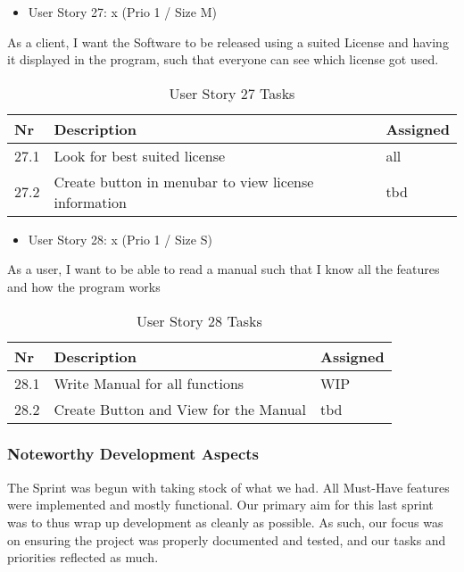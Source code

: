 \begin{itemize}
	\item User Story 27: x (Prio 1 / Size M)
	\end{itemize}
As a client,
I want the Software to be released using a suited License and having it displayed in the program,
such that everyone can see which license got used.	
\begin{table}[h]
  \caption{User Story 27 Tasks}
  \label{Story 23 Tasks}
  \centering
  \begin{tabular}{p{1cm}|p{5cm}|p{3cm}|}
  	Nr & Description & Assigned \\ 
  	\hline
  	27.1 & Look for best suited license & all \\ 
  	\hline
  	27.2 & Create button in menubar to view license information & tbd \\ 
  	\hline
  \end{tabular}
\end{table}

\newpage
\begin{itemize}
	\item User Story 28: x (Prio 1 / Size S)
	\end{itemize}
As a user,
I want to be able to read a manual
such that I know all the features and how the program works
\begin{table}[h!]
  \caption{User Story 28 Tasks}
  \label{Story 28 Tasks}
  \centering
  \begin{tabular}{p{1cm}|p{5cm}|p{3cm}|}
  	Nr & Description & Assigned \\ 
  	\hline
  	28.1 & Write Manual for all functions & WIP \\ 
  	\hline
  	28.2 & Create Button and View for the Manual & tbd \\ 
  	\hline
  \end{tabular}
\end{table}

\subsubsection*{Noteworthy Development Aspects}

The Sprint was begun with taking stock of what we had. All Must-Have features were implemented and mostly functional.
Our primary aim for this last sprint was to thus wrap up development as cleanly as possible. 
As such, our focus was on ensuring the project was properly documented and tested, and our tasks and priorities reflected as much. 

